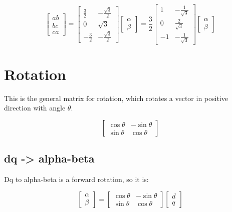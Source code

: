 \documentclass[]{book}
\begin{document}
\[
\begin{bmatrix} ab\\ bc \\ ca \end{bmatrix}
= \begin{bmatrix} \frac{3}{2} & -\frac{\sqrt{3}}{2} \\  0 & \sqrt{3} \\ 
-\frac{3}{2} & -\frac{\sqrt{3}}{2} \end{bmatrix}
\begin{bmatrix} \alpha\\ \beta \end{bmatrix}
= \frac{3}{2} \begin{bmatrix} 1 & -\frac{1}{\sqrt{3}} \\  0 & \frac{2}{\sqrt{3}} \\ 
-1 & -\frac{1}{\sqrt{3}} \end{bmatrix}
\begin{bmatrix} \alpha\\ \beta \end{bmatrix}
\label{eq:AB2LLmat}
\]

\hypertarget{rotation}{%
\section{Rotation}\label{rotation}}

This is the general matrix for rotation, which rotates a vector in positive direction with angle \(\theta\).

\[
\begin{bmatrix} \cos\theta & -\sin\theta \\  \sin\theta & \cos\theta  \end{bmatrix}
\label{eq:transRot}
\]

\hypertarget{dq---alpha-beta}{%
\subsection{dq -\textgreater{} alpha-beta}\label{dq---alpha-beta}}

Dq to alpha-beta is a forward rotation, so it is:

\[
\begin{bmatrix} \alpha \\  \beta  \end{bmatrix} =
\begin{bmatrix} \cos\theta & -\sin\theta \\  \sin\theta & \cos\theta  \end{bmatrix}
\begin{bmatrix} d \\  q  \end{bmatrix}
\label{eq:transAbDq}
\]
\end{document}
